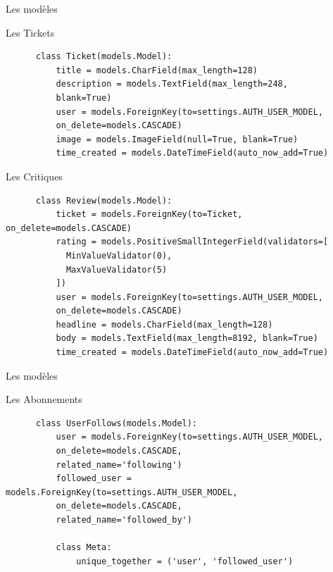 \begin{frame}[fragile]{Les modèles}
  \begin{block}{Les Tickets}
    \tiny
    \begin{lstlisting}
      class Ticket(models.Model):
          title = models.CharField(max_length=128)
          description = models.TextField(max_length=248,
          blank=True)
          user = models.ForeignKey(to=settings.AUTH_USER_MODEL,
          on_delete=models.CASCADE)
          image = models.ImageField(null=True, blank=True)
          time_created = models.DateTimeField(auto_now_add=True)
    \end{lstlisting}    
  \end{block}

  \begin{block}{Les Critiques}
    \tiny
    \begin{lstlisting}
      class Review(models.Model):
          ticket = models.ForeignKey(to=Ticket, on_delete=models.CASCADE)
          rating = models.PositiveSmallIntegerField(validators=[
            MinValueValidator(0),
            MaxValueValidator(5)
          ])
          user = models.ForeignKey(to=settings.AUTH_USER_MODEL,
          on_delete=models.CASCADE)
          headline = models.CharField(max_length=128)
          body = models.TextField(max_length=8192, blank=True)
          time_created = models.DateTimeField(auto_now_add=True)
    \end{lstlisting}
  \end{block}
\end{frame}

\begin{frame}[fragile]{Les modèles}
  \begin{block}{Les Abonnements}
    \tiny
    \begin{lstlisting}
      class UserFollows(models.Model):
          user = models.ForeignKey(to=settings.AUTH_USER_MODEL,
          on_delete=models.CASCADE,
          related_name='following')
          followed_user = models.ForeignKey(to=settings.AUTH_USER_MODEL,
          on_delete=models.CASCADE,
          related_name='followed_by')
          
          class Meta:
              unique_together = ('user', 'followed_user')
    \end{lstlisting}    
  \end{block}
\end{frame}

